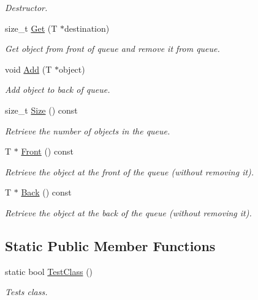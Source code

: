 \begin{DoxyCompactItemize}
\begin{DoxyCompactList}\small\item\em Destructor. \item\end{DoxyCompactList}\item 
size\_\-t \hyperlink{class_store_queue_a21d6d227bf4303022384a9ef5ab54c61}{Get} (T $\ast$destination)
\begin{DoxyCompactList}\small\item\em Get object from front of queue and remove it from queue. \item\end{DoxyCompactList}\item 
void \hyperlink{class_store_queue_a333cd8c9af7f748401c8ad97c1487556}{Add} (T $\ast$object)
\begin{DoxyCompactList}\small\item\em Add object to back of queue. \item\end{DoxyCompactList}\item 
size\_\-t \hyperlink{class_store_queue_a69b4ffee7bd2200c74eec51f5b9b5e6d}{Size} () const 
\begin{DoxyCompactList}\small\item\em Retrieve the number of objects in the queue. \item\end{DoxyCompactList}\item 
T $\ast$ \hyperlink{class_store_queue_a94f37b5741e7c96a6072a2d42fa11292}{Front} () const 
\begin{DoxyCompactList}\small\item\em Retrieve the object at the front of the queue (without removing it). \item\end{DoxyCompactList}\item 
T $\ast$ \hyperlink{class_store_queue_ae1dd92855531862ecd695ae3d6b708d3}{Back} () const 
\begin{DoxyCompactList}\small\item\em Retrieve the object at the back of the queue (without removing it). \item\end{DoxyCompactList}\end{DoxyCompactItemize}
\subsection*{Static Public Member Functions}
\begin{DoxyCompactItemize}
\item 
static bool \hyperlink{class_store_queue_a5d0a9920f0587c359767e449aa580916}{TestClass} ()
\begin{DoxyCompactList}\small\item\em Tests class. \item\end{DoxyCompactList}\end{DoxyCompactItemize}

